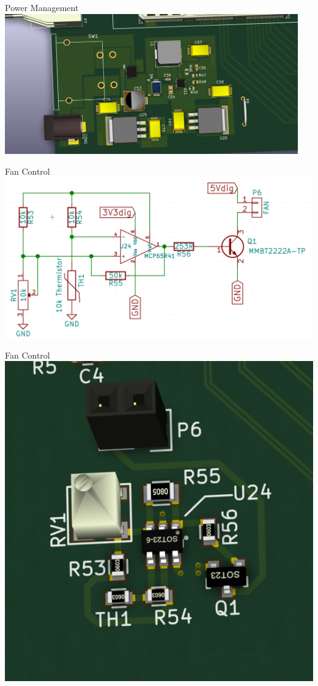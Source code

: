 \documentclass{beamer}
\begin{document}
\begin{frame}{Power Management}
  \centering
  \includegraphics[width=0.95\textwidth]{figures/DAQCard2015_Power_small}
\end{frame}

\begin{frame}{Fan Control}
  \centering
  \includegraphics[width=\textwidth]{figures/Fan_Control_Schem}
\end{frame}

\begin{frame}{Fan Control}
  \centering
  \includegraphics[height=\textheight]{figures/DAQCard2015_Fan_Control_small}
\end{frame}
\end{document}
